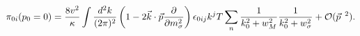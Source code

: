 \begin{equation}
{\cal{\pi}}_{0i}(p_0=0) = \frac{8 v^2}{\kappa}\int \frac{d^2k}{(2
\pi)^2} \left(1 - 2 \vec{k} \cdot \vec{p} \frac{\partial}{\partial
m_{\sigma}^2} \right) \epsilon_{0ij} k^j T \sum_{n}\frac{1}{k_0^2 +
w_M^2} \frac{1}{k_0^2 + w_{\sigma}^2} + {\cal{O}} (\vec{p}^{\phantom a
  2}).
\end{equation}

